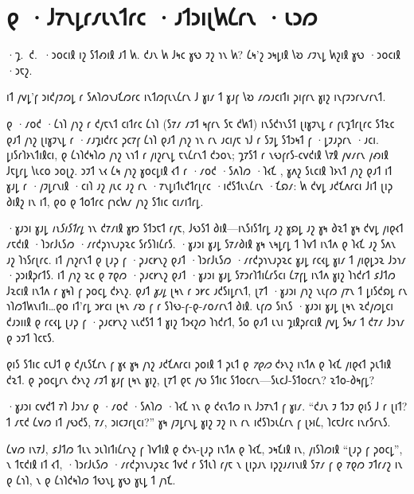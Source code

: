 \chapter{𐑞 ·𐑓𐑳𐑯𐑛𐑩𐑥𐑧𐑯𐑑𐑩𐑤 ·𐑨𐑑𐑮𐑦𐑚𐑿𐑖𐑩𐑯 ·𐑧𐑮𐑼}

\begin{chapterOpeningAuthorNote}
·𐑡.~𐑒.~·𐑮𐑴𐑤𐑦𐑙 𐑦𐑟 𐑕𐑑𐑺𐑦𐑙 𐑨𐑑 𐑿. 𐑒𐑨𐑯 𐑿 𐑓𐑰𐑤 𐑣𐑻 𐑲𐑟 𐑪𐑯 𐑿? 𐑖𐑰'𐑟 𐑮𐑰𐑛𐑦𐑙 𐑘𐑹 𐑥𐑲𐑯𐑛 𐑿𐑟𐑦𐑙 𐑣𐑻 ·𐑮𐑴𐑤𐑦𐑙 ·𐑮𐑱𐑟.
\end{chapterOpeningAuthorNote}
\begin{chapterOpeningQuote}
𐑦𐑑 𐑢𐑫𐑛'𐑝 𐑮𐑦𐑒𐑢𐑲𐑼𐑛 𐑩 𐑕𐑵𐑐𐑼𐑯𐑨𐑗𐑼𐑩𐑤 𐑦𐑯𐑑𐑼𐑝𐑧𐑯𐑖𐑩𐑯 𐑓 𐑣𐑦𐑥 𐑑 𐑣𐑨𐑝 𐑘𐑹 𐑥𐑼𐑨𐑤𐑦𐑑𐑦 𐑜𐑦𐑝𐑩𐑯 𐑣𐑦𐑟 𐑦𐑯𐑝𐑲𐑮𐑩𐑯𐑥𐑩𐑯𐑑.
\end{chapterOpeningQuote}

\lettrine{𐑞}{} ·𐑥𐑴𐑒 ·𐑖𐑪𐑐 𐑢𐑪𐑟 𐑩 𐑒𐑢𐑱𐑯𐑑 𐑤𐑦𐑑𐑩𐑤 𐑖𐑪𐑐 (𐑕𐑳𐑥 𐑥𐑲𐑑 𐑰𐑝𐑩𐑯 𐑕𐑱 𐑒𐑿𐑑) 𐑦𐑯𐑕𐑒𐑪𐑯𐑕𐑑 𐑚𐑦𐑣𐑲𐑯𐑛 𐑩 𐑝𐑧𐑡𐑑𐑩𐑚𐑩𐑤 𐑕𐑑𐑷𐑤 𐑞𐑨𐑑 𐑢𐑪𐑟 𐑚𐑦𐑣𐑲𐑯𐑛 𐑩 ·𐑥𐑨𐑡𐑦𐑒𐑩𐑤 𐑜𐑤𐑳𐑝 𐑖𐑪𐑐 𐑞𐑨𐑑 𐑢𐑪𐑟 𐑪𐑯 𐑩𐑯 𐑨𐑤𐑦𐑢𐑱 𐑪𐑓 𐑩 𐑕𐑲𐑛 𐑕𐑑𐑮𐑰𐑑 𐑝 ·𐑛𐑲𐑨𐑜𐑩𐑯 ·𐑨𐑤𐑦. 𐑛𐑦𐑕𐑩𐑐𐑶𐑯𐑑𐑦𐑙𐑤𐑦, 𐑞 𐑖𐑪𐑐𐑒𐑰𐑐𐑼 𐑢𐑪𐑟 𐑯𐑪𐑑 𐑩 𐑢𐑦𐑟𐑩𐑯𐑛 𐑱𐑯𐑖𐑩𐑯𐑑 𐑒𐑮𐑴𐑯; 𐑡𐑳𐑕𐑑 𐑩 𐑯𐑻𐑝𐑩𐑕-𐑤𐑫𐑒𐑦𐑙 𐑘𐑳𐑙 𐑢𐑫𐑥𐑩𐑯 𐑢𐑺𐑦𐑙 𐑓𐑱𐑛𐑩𐑛 𐑘𐑧𐑤𐑴 𐑮𐑴𐑚𐑟. 𐑮𐑲𐑑 𐑯𐑬 𐑖𐑰 𐑢𐑪𐑟 𐑣𐑴𐑤𐑛𐑦𐑙 𐑬𐑑 𐑩 ·𐑥𐑴𐑒 ·𐑕𐑵𐑐𐑼 ·𐑐𐑬𐑗 , 𐑣𐑵𐑟 𐑕𐑧𐑤𐑦𐑙 𐑐𐑶𐑯𐑑 𐑢𐑪𐑟 𐑞𐑨𐑑 𐑦𐑑 𐑣𐑨𐑛 𐑩 ·𐑢𐑲𐑛𐑩𐑯𐑦𐑙 ·𐑤𐑦𐑐 𐑨𐑟 𐑢𐑧𐑤 𐑨𐑟 𐑩𐑯 ·𐑳𐑯𐑛𐑦𐑑𐑧𐑒𐑑𐑩𐑚𐑩𐑤 ·𐑦𐑒𐑕𐑑𐑧𐑯𐑖𐑩𐑯 ·𐑗𐑸𐑥: 𐑿 𐑒𐑫𐑛 𐑨𐑒𐑗𐑵𐑩𐑤𐑦 𐑓𐑦𐑑 𐑚𐑦𐑜 𐑔𐑦𐑙𐑟 𐑦𐑯 𐑦𐑑, 𐑞𐑴 𐑞 𐑑𐑴𐑑𐑩𐑤 𐑝𐑪𐑤𐑿𐑥 𐑢𐑪𐑟 𐑕𐑑𐑦𐑤 𐑤𐑦𐑥𐑦𐑑𐑩𐑛.

·𐑣𐑨𐑮𐑦 𐑣𐑨𐑛 \emph{𐑦𐑯𐑕𐑦𐑕𐑑𐑩𐑛} 𐑪𐑯 𐑒𐑳𐑥𐑦𐑙 𐑣𐑽 𐑕𐑑𐑮𐑱𐑑 𐑩𐑢𐑱, 𐑓𐑻𐑕𐑑 𐑔𐑦𐑙—𐑦𐑯𐑕𐑦𐑕𐑑𐑩𐑛 𐑨𐑟 𐑣𐑸𐑛 𐑨𐑟 𐑣𐑰 𐑔𐑷𐑑 𐑣𐑰 𐑒𐑫𐑛 𐑢𐑦𐑞𐑬𐑑 𐑥𐑱𐑒𐑦𐑙 ·𐑐𐑮𐑩𐑓𐑧𐑕𐑼 ·𐑥𐑩𐑒𐑜𐑪𐑯𐑨𐑜𐑷𐑤 𐑕𐑩𐑕𐑐𐑦𐑖𐑩𐑕. ·𐑣𐑨𐑮𐑦 𐑣𐑨𐑛 𐑕𐑳𐑥𐑔𐑦𐑙 𐑣𐑰 𐑯𐑰𐑛𐑩𐑛 𐑑 𐑐𐑫𐑑 𐑦𐑯𐑑𐑵 𐑞 𐑐𐑬𐑗 𐑨𐑟 𐑕𐑵𐑯 𐑨𐑟 𐑐𐑪𐑕𐑩𐑚𐑩𐑤. 𐑦𐑑 𐑢𐑪𐑟𐑩𐑯𐑑 𐑞 𐑚𐑨𐑜 𐑝 ·𐑜𐑨𐑤𐑾𐑯𐑟 𐑞𐑨𐑑 ·𐑐𐑮𐑩𐑓𐑧𐑕𐑼 ·𐑥𐑩𐑒𐑜𐑪𐑯𐑨𐑜𐑷𐑤 𐑣𐑨𐑛 𐑩𐑤𐑬𐑛 𐑣𐑦𐑥 𐑑 𐑢𐑦𐑞𐑛𐑮𐑷 𐑓𐑮𐑪𐑥 ·𐑜𐑮𐑦𐑙𐑜𐑩𐑑𐑕. 𐑦𐑑 𐑢𐑪𐑟 𐑷𐑤 𐑞 𐑳𐑞𐑼 ·𐑜𐑨𐑤𐑾𐑯𐑟 𐑞𐑨𐑑 ·𐑣𐑨𐑮𐑦 𐑣𐑨𐑛 𐑕𐑳𐑮𐑩𐑐𐑑𐑦𐑖𐑩𐑕𐑤𐑦 𐑖𐑳𐑝𐑛 𐑦𐑯𐑑𐑵 𐑣𐑦𐑟 𐑐𐑪𐑒𐑩𐑑 𐑭𐑓𐑑𐑼 𐑓𐑷𐑤𐑦𐑙 𐑦𐑯𐑑𐑵 𐑩 𐑣𐑰𐑐 𐑝 𐑜𐑴𐑤𐑛 𐑒𐑶𐑯𐑟. 𐑞𐑨𐑑 \emph{𐑣𐑨𐑛} 𐑚𐑰𐑯 𐑩 𐑮𐑾𐑤 𐑨𐑒𐑕𐑦𐑛𐑩𐑯𐑑, 𐑚𐑳𐑑 ·𐑣𐑨𐑮𐑦 𐑢𐑪𐑟 𐑯𐑧𐑝𐑼 𐑢𐑳𐑯 𐑑 𐑛𐑦𐑕𐑒𐑸𐑛 𐑩𐑯 𐑪𐑐𐑼𐑑𐑿𐑯𐑦𐑑𐑦…𐑞𐑴 𐑦𐑑'𐑩𐑛 𐑮𐑾𐑤𐑦 𐑚𐑰𐑯 𐑥𐑹 𐑝 𐑩 𐑕𐑐𐑻-𐑝-𐑞-𐑥𐑴𐑥𐑩𐑯𐑑 𐑔𐑦𐑙. 𐑧𐑝𐑼 𐑕𐑦𐑯𐑕 ·𐑣𐑨𐑮𐑦 𐑣𐑨𐑛 𐑚𐑰𐑯 𐑷𐑒𐑢𐑼𐑛𐑤𐑦 𐑒𐑨𐑮𐑦𐑦𐑙 𐑞 𐑩𐑤𐑬𐑛 𐑚𐑨𐑜 𐑝 ·𐑜𐑨𐑤𐑾𐑯𐑟 𐑯𐑧𐑒𐑕𐑑 𐑑 𐑣𐑦𐑟 𐑑𐑮𐑬𐑟𐑼 𐑐𐑪𐑒𐑩𐑑, 𐑕𐑴 𐑞𐑨𐑑 𐑧𐑯𐑦 𐑡𐑦𐑙𐑜𐑩𐑤𐑦𐑙 𐑢𐑫𐑛 𐑕𐑰𐑥 𐑑 𐑒𐑳𐑥 𐑓𐑮𐑪𐑥 𐑞 𐑮𐑲𐑑 𐑐𐑤𐑱𐑕.

𐑞𐑦𐑕 𐑕𐑑𐑦𐑤 𐑤𐑧𐑓𐑑 𐑞 𐑒𐑢𐑧𐑕𐑗𐑩𐑯 𐑝 𐑣𐑬 𐑣𐑰 𐑢𐑪𐑟 𐑨𐑒𐑗𐑵𐑩𐑤𐑦 𐑜𐑴𐑦𐑙 𐑑 𐑜𐑧𐑑 𐑞 \emph{𐑳𐑞𐑼} 𐑒𐑶𐑯𐑟 𐑦𐑯𐑑𐑵 𐑞 𐑐𐑬𐑗 𐑢𐑦𐑞𐑬𐑑 𐑜𐑧𐑑𐑦𐑙 𐑒𐑷𐑑. 𐑞 𐑜𐑴𐑤𐑛𐑩𐑯 𐑒𐑶𐑯𐑟 𐑥𐑲𐑑 𐑣𐑨𐑝 𐑚𐑰𐑯 𐑣𐑦𐑟, 𐑚𐑳𐑑 𐑞𐑱 𐑢𐑻 𐑕𐑑𐑦𐑤 𐑕𐑑𐑴𐑤𐑩𐑯—𐑕𐑧𐑤𐑓-𐑕𐑑𐑴𐑤𐑩𐑯? 𐑷𐑑𐑴-𐑔𐑰𐑝𐑛?

·𐑣𐑨𐑮𐑦 𐑤𐑫𐑒𐑑 𐑳𐑐 𐑓𐑮𐑪𐑥 𐑞 ·𐑥𐑴𐑒 ·𐑕𐑵𐑐𐑼 ·𐑐𐑬𐑗  𐑪𐑯 𐑞 𐑒𐑬𐑯𐑑𐑼 𐑦𐑯 𐑓𐑮𐑳𐑯𐑑 𐑝 𐑣𐑦𐑥. “𐑒𐑨𐑯 𐑲 𐑑𐑮𐑲 𐑞𐑦𐑕 𐑓 𐑩 𐑚𐑦𐑑? 𐑑 𐑥𐑱𐑒 𐑖𐑫𐑼 𐑦𐑑 𐑢𐑻𐑒𐑕, 𐑳𐑥, 𐑮𐑦𐑤𐑲𐑩𐑚𐑤𐑦?” 𐑣𐑰 𐑢𐑲𐑛𐑩𐑯𐑛 𐑣𐑦𐑟 𐑲𐑟 𐑦𐑯 𐑩𐑯 𐑦𐑒𐑕𐑐𐑮𐑧𐑖𐑩𐑯 𐑝 𐑚𐑶𐑦𐑖, 𐑐𐑤𐑱𐑓𐑩𐑤 𐑦𐑯𐑩𐑕𐑩𐑯𐑕.

𐑖𐑫𐑼 𐑦𐑯𐑳𐑓, 𐑭𐑓𐑑𐑼 𐑑𐑧𐑯 𐑮𐑧𐑐𐑦𐑑𐑦𐑖𐑩𐑯𐑟 𐑝 𐑐𐑫𐑑𐑦𐑙 𐑞 𐑒𐑶𐑯-𐑚𐑨𐑜 𐑦𐑯𐑑𐑵 𐑞 𐑐𐑬𐑗, 𐑮𐑰𐑗𐑦𐑙 𐑦𐑯, 𐑢𐑦𐑕𐑐𐑼𐑦𐑙 “𐑚𐑨𐑜 𐑝 𐑜𐑴𐑤𐑛”, 𐑯 𐑑𐑱𐑒𐑦𐑙 𐑦𐑑 𐑬𐑑, ·𐑐𐑮𐑩𐑓𐑧𐑕𐑼 ·𐑥𐑩𐑒𐑜𐑪𐑯𐑨𐑜𐑷𐑤 𐑑𐑫𐑒 𐑩 𐑕𐑑𐑧𐑐 𐑩𐑢𐑱 𐑯 𐑚𐑦𐑜𐑨𐑯 𐑦𐑜𐑟𐑨𐑥𐑦𐑯𐑦𐑙 𐑕𐑳𐑥 𐑝 𐑞 𐑳𐑞𐑼 𐑲𐑑𐑩𐑥𐑟 𐑦𐑯 𐑞 𐑖𐑪𐑐, 𐑯 𐑞 𐑖𐑪𐑐𐑒𐑰𐑐𐑼 𐑑𐑻𐑯𐑛 𐑣𐑻 𐑣𐑧𐑛 𐑑 𐑢𐑪𐑗.

